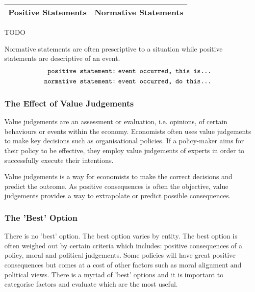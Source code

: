 \documentclass[a4paper,10pt]{article}
\makeatletter
\newenvironment{tablehere}{\def\@captype{table}}{}
\makeatother
\begin{document}
\begin{multicols}{2}
	\begin{center}
		\begin{tablehere}
			\begin{tabular}{|c|c|}
				\hline
				Positive Statements & Normative Statements \\
				\hline
			\end{tabular}
		\end{tablehere}

		\Huge TODO
	\end{center}

	Normative statements are often prescriptive to a situation while positive statements are descriptive of an event.
	\begin{align*}
		\text{\texttt{positive statement:}}  & \ \text{\texttt{event occurred, this is...}}
		\\
		\text{\texttt{normative statement:}} & \ \text{\texttt{event occurred, do this...}}
	\end{align*}

	\subsubsection{The Effect of Value Judgements}
	Value judgements are an assessment or evaluation, i.e. opinions, of certain behaviours or events within the economy. Economists often uses value judgements to make key decisions such as organisational policies. If a policy-maker aims for their policy to be effective, they employ value judgements of experts in order to successfully execute their intentions.
	\medskip

	Value judgements is a way for economists to make the correct decisions and predict the outcome. As positive consequences is often the objective, value judgements provides a way to extrapolate or predict possible consequences.

	\subsubsection{The 'Best' Option}
	There is no 'best' option. The best option varies by entity. The best option is often weighed out by certain criteria which includes: positive consequences of a policy, moral and political judgements. Some policies will have great positive consequences but comes at a cost of other factors such as moral alignment and political views. There is a myriad of 'best' options and it is important to categorise factors and evaluate which are the most useful.


\end{multicols}
\end{document}
